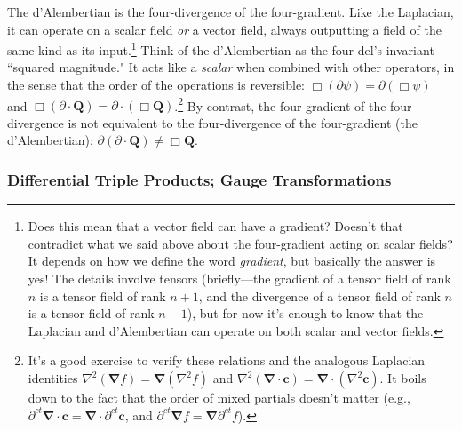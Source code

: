 \documentclass[12pt]{article}
\renewcommand{\vv}[1]{\mathbf{#1}}
\newcommand{\del}{\boldsymbol{\nabla}}
\begin{document}
The d'Alembertian is the four-divergence of the four-gradient. Like the Laplacian, it can operate on a scalar field \emph{or} a vector field, always outputting a field of the same kind as its input.\footnote{\label{fn:gd}Does this mean that a vector field can have a gradient? Doesn't that contradict what we said above about the four-gradient acting on scalar fields? It depends on how we define the word \emph{gradient}, but basically the answer is yes! The details involve tensors (briefly---the gradient of a tensor field of rank $n$ is a tensor field of rank $n + 1$, and the divergence of a tensor field of rank $n$ is a tensor field of rank $n - 1$), but for now it's enough to know that the Laplacian and d'Alembertian can operate on both scalar and vector fields.} Think of the d'Alembertian as the four-del's invariant ``squared magnitude." It acts like a \emph{scalar} when combined with other operators, in the sense that the order of the operations is reversible: $\Box (\partialup \psi) = \partialup (\Box \psi)$ and $\Box (\partialup \cdot \vv Q) = \partialup \cdot (\Box \vv Q)$.\footnote{It's a good exercise to verify these relations and the analogous Laplacian identities $\nabla ^2 (\del f) = \del (\nabla ^2 f)$ and $\nabla ^2 (\del \cdot \vv c) = \del \cdot (\nabla ^2 \vv c)$. It boils down to the fact that the order of mixed partials doesn't matter (e.g., $\partial^{ct} \del \cdot \vv c = \del \cdot \partial^{ct} \vv c$, and $\partial^{ct} \del f = \del \partial^{ct} f$).} By contrast, the four-gradient of the four-divergence is not equivalent to the four-divergence of the four-gradient (the d'Alembertian): $\partialup (\partialup \cdot \vv Q) \neq \Box \vv Q$.


\subsubsection{Differential Triple Products; Gauge Transformations}\label{sssec:tp}
\end{document}
